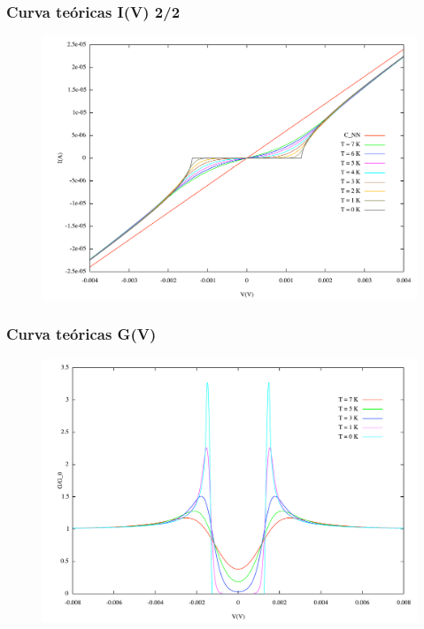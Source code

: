 \begin{frame}
\frametitle{Curva te\'oricas I(V) 2/2}

\begin{figure}[!h] \label{iv_teorico2}
\includegraphics[width=\textwidth]{iv_teorico2}
\end{figure}

\end{frame}
\begin{frame}
\frametitle{Curva te\'oricas G(V)}

\begin{figure}[!h] \label{gv_teorico}
\includegraphics[width=\textwidth]{gv_teorico}
\end{figure}

\end{frame}


